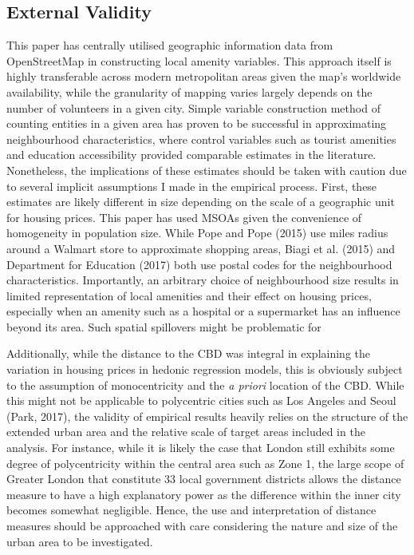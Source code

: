 \documentclass{article}
\begin{document}
\subsection{External Validity}
This paper has centrally utilised geographic information data from OpenStreetMap in constructing local amenity variables. This approach itself is highly transferable across modern metropolitan areas given the map's worldwide availability, while the granularity of mapping varies largely depends on the number of volunteers in a given city. Simple variable construction method of counting entities in a given area has proven to be successful in approximating neighbourhood characteristics, where control variables such as tourist amenities and education accessibility provided comparable estimates in the literature. Nonetheless, the implications of these estimates should be taken with caution due to several implicit assumptions I made in the empirical process. First, these estimates are likely different in size depending on the scale of a geographic unit for housing prices. This paper has used MSOAs given the convenience of homogeneity in population size. While Pope and Pope (2015) use miles radius around a Walmart store to approximate shopping areas, Biagi et al. (2015) and Department for Education (2017) both use postal codes for the neighbourhood characteristics. Importantly, an arbitrary choice of neighbourhood size results in limited representation of local amenities and their effect on housing prices, especially when an amenity such as a hospital or a supermarket has an influence beyond its area. Such spatial spillovers might be problematic for 

Additionally, while the distance to the CBD was integral in explaining the variation in housing prices in hedonic regression models, this is obviously subject to the assumption of monocentricity and the \textit{a priori} location of the CBD. While this might not be applicable to polycentric cities such as Los Angeles and Seoul (Park, 2017), the validity of empirical results heavily relies on the structure of the extended urban area and the relative scale of target areas included in the analysis. For instance, while it is likely the case that London still exhibits some degree of polycentricity within the central area such as Zone 1, the large scope of Greater London that constitute 33 local government districts allows the distance measure to have a high explanatory power as the difference within the inner city becomes somewhat negligible. Hence, the use and interpretation of distance measures should be approached with care considering the nature and size of the urban area to be investigated.
\end{document}
